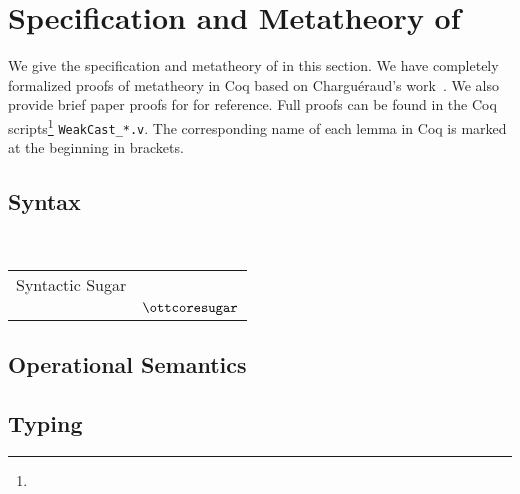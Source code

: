 \section{Specification and Metatheory of \ecore}
We give the specification and metatheory of \ecore in this section. We
have completely formalized proofs of metatheory in Coq based on
Chargu{\'e}raud's work~. We also provide brief paper
proofs for \ecore for reference. Full proofs can be found in the Coq
scripts\footnote{\fullurl} \verb|WeakCast_*.v|. The corresponding name of
each lemma in Coq is marked at the beginning in brackets.

\subsection{Syntax}
\begin{center}
\begin{minipage}{0.55\textwidth}
\gram{\ottec}
\end{minipage}
\begin{minipage}{0.4\textwidth}
\gram{
  \ottGg\ottinterrule
  \ottv}
\end{minipage}
\\
\end{center}
\begin{tabular}{ll}
Syntactic Sugar \\
& $\ottcoresugar$ %
\end{tabular}

\subsection{Operational Semantics}
\ottdefnstep{}

\subsection{Typing}
\ottdefnctx{}\ottinterrule
\ottdefnexpr{}

